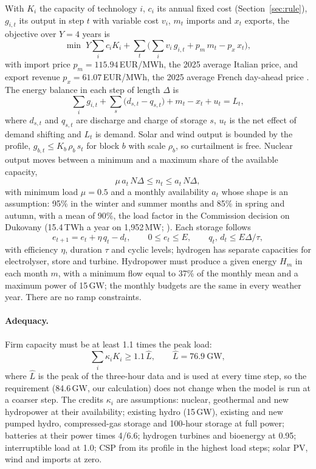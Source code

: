 With $K_i$ the capacity of technology $i$, $c_i$ its annual fixed cost (Section~\ref{sec:rule}), $g_{i,t}$ its output in step $t$ with variable cost $v_i$, $m_t$ imports and $x_t$ exports, the objective over $Y=4$ years is
\begin{equation}
\min\; Y\sum_i c_i K_i+\sum_t\Big(\sum_i v_i\,g_{i,t}+p_m\,m_t-p_x\,x_t\Big),
\end{equation}
with import price $p_m=115.94$\,EUR/MWh, the 2025 average Italian price, and export revenue $p_x=61.07$\,EUR/MWh, the 2025 average French day-ahead price \citep{GME2025,RTE2025}. The energy balance in each step of length $\Delta$ is
\begin{equation}
\sum_i g_{i,t}+\sum_s\big(d_{s,t}-q_{s,t}\big)+m_t-x_t+u_t=L_t ,\label{eq:balance}
\end{equation}
where $d_{s,t}$ and $q_{s,t}$ are discharge and charge of storage $s$, $u_t$ is the net effect of demand shifting and $L_t$ is demand. Solar and wind output is bounded by the profile, $g_{b,t}\le K_b\,\rho_b\,s_t$ for block $b$ with scale $\rho_b$, so curtailment is free. Nuclear output moves between a minimum and a maximum share of the available capacity,
\begin{equation}
\mu\,a_t\,N\Delta\le n_t\le a_t\,N\Delta ,
\end{equation}
with minimum load $\mu=0.5$ and a monthly availability $a_t$ whose shape is an assumption: 95\% in the winter and summer months and 85\% in spring and autumn, with a mean of 90\%, the load factor in the Commission decision on Dukovany (15.4\,TWh a year on 1{,}952\,MW; \citealp{ECDukovany2026}). Each storage follows
\begin{equation}
e_{t+1}=e_t+\eta\,q_t-d_t,\qquad 0\le e_t\le E,\qquad q_t,\,d_t\le E\Delta/\tau ,
\end{equation}
with efficiency $\eta$, duration $\tau$ and cyclic levels; hydrogen has separate capacities for electrolyser, store and turbine. Hydropower must produce a given energy $H_m$ in each month $m$, with a minimum flow equal to 37\% of the monthly mean and a maximum power of 15\,GW; the monthly budgets are the same in every weather year. There are no ramp constraints.

\paragraph{Adequacy.} Firm capacity must be at least 1.1 times the peak load:
\begin{equation}
\sum_i \kappa_i K_i\ge 1.1\,\hat L ,\qquad \hat L=76.9\ \mathrm{GW},
\end{equation}
where $\hat L$ is the peak of the three-hour data and is used at every time step, so the requirement (84.6\,GW, our calculation) does not change when the model is run at a coarser step. The credits $\kappa_i$ are assumptions: nuclear, geothermal and new hydropower at their availability; existing hydro (15\,GW), existing and new pumped hydro, compressed-gas storage and 100-hour storage at full power; batteries at their power times 4/6.6; hydrogen turbines and bioenergy at 0.95; interruptible load at 1.0; CSP from its profile in the highest load steps; solar PV, wind and imports at zero.

